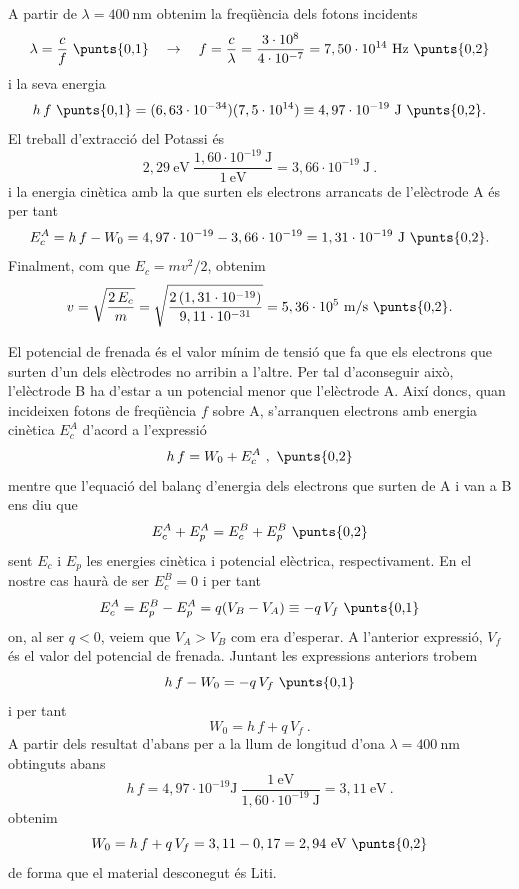\begin{solapartat}
A partir de $\lambda = 400\ \mathrm{nm}$ obtenim la freqüència dels fotons incidents
\[ \lambda = \frac{c}{f} \ \text{\punts{0,1}} \quad\to\quad f = \frac{c}{\lambda} = \frac{3\cdot 10^{8}}{4\cdot 10^{-7}} = 7,50\cdot 10^{14}\ \mathrm{Hz} \ \text{\punts{0,2}} \]
i la seva energia
\[ h\,f \ \text{\punts{0,1}} = (6,63\cdot 10^{-34})(7,5\cdot 10^{14}) \equiv 4,97\cdot 10^{-19}\ \mathrm{J} \ \text{\punts{0,2}}. \]
El treball d'extracció del Potassi és
\[ 2,29\ \mathrm{eV}\ \frac{1,60\cdot 10^{-19}\ \mathrm{J}}{1\ \mathrm{eV}} = 3,66\cdot 10^{-19}\ \mathrm{J}\ . \]
i la energia cinètica amb la que surten els electrons arrancats de l'elèctrode A és per tant
\[ E_c^A = h\,f - W_0 = 4,97\cdot 10^{-19} - 3,66\cdot 10^{-19} = 1,31\cdot 10^{-19}\ \mathrm{J} \ \text{\punts{0,2}}. \]
Finalment, com que $E_c = mv^2/2$, obtenim
\[ v = \sqrt{\frac{2\,E_c}{m}} = \sqrt{\frac{2\,(1,31\cdot 10^{-19})}{9,11\cdot 10^{-31}}} = 5,36\cdot 10^{5}\ \mathrm{m/s} \ \text{\punts{0,2}}. \]
\end{solapartat}

\begin{solapartat}
El potencial de frenada és el valor mínim de tensió que fa que els electrons que surten d'un dels elèctrodes no arribin a l'altre. Per tal d'aconseguir això, l'elèctrode B ha d'estar a un potencial menor que l'elèctrode A. Així doncs, quan incideixen fotons de freqüència $f$ sobre A, s'arranquen electrons amb energia cinètica $E_c^A$ d'acord a l'expressió
\[ h\,f = W_0 + E_c^A\ , \ \text{\punts{0,2}} \]
mentre que l'equació del balanç d'energia dels electrons que surten de A i van a B ens diu que
\[ E_c^A + E_p^A = E_c^B + E_p^B \ \text{\punts{0,2}} \]
sent $E_c$ i $E_p$ les energies cinètica i potencial elèctrica, respectivament. En el nostre cas haurà de ser $E_c^B = 0$ i per tant
\[ E_c^A = E_p^B - E_p^A = q(V_B - V_A) \equiv -q\,V_f \ \text{\punts{0,1}} \]
on, al ser $q < 0$, veiem que $V_A > V_B$ com era d'esperar. A l'anterior expressió, $V_f$ és el valor del potencial de frenada. Juntant les expressions anteriors trobem
\[ h\,f - W_0 = -q\,V_f \ \text{\punts{0,1}} \]
i per tant
\[ W_0 = h\,f + q\,V_f\ . \]
A partir dels resultat d'abans per a la llum de longitud d'ona $\lambda = 400\ \mathrm{nm}$ obtinguts abans
\[ h\,f = 4,97\cdot 10^{-19}\mathrm{J}\ \frac{1\ \mathrm{eV}}{1,60\cdot 10^{-19}\ \mathrm{J}} = 3,11\ \mathrm{eV}\ . \]
obtenim
\[ W_0 = h\,f + q\,V_f = 3,11 - 0,17 = 2,94\ \mathrm{eV} \ \text{\punts{0,2}} \]
de forma que el material desconegut és Liti. 
\end{solapartat}
